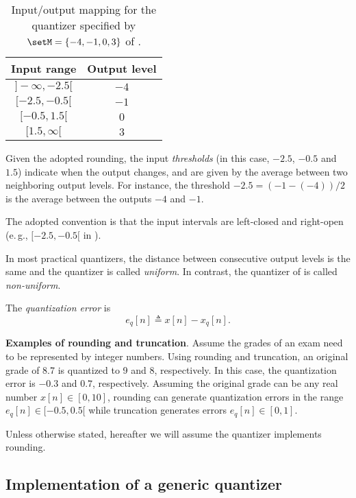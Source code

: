 \begin{table}
\centering
\caption{Input/output mapping for the quantizer specified by $\setM = \{-4,-1,0,3 \}$ of .\label{tab:nonuniform_quantizer}}
\begin{tabular}{|c|c|}
\hline
Input range  & Output level \\ \hline
$]- \infty, -2.5[$ & $-4$ \\ \hline
$[-2.5, -0.5[$ & $-1$ \\ \hline
$[-0.5, 1.5[$ & $0$ \\ \hline
$[1.5, \infty[$ & $3$ \\ \hline
\end{tabular}
\end{table}

Given the adopted rounding, the input \emph{thresholds} (in this case, $-2.5$, $-0.5$ and $1.5$) indicate when the output changes, and are given by the average between two neighboring output levels. For instance, the threshold $-2.5 = (-1 - (-4))/2$ is the average between the outputs $-4$ and $-1$.
\eExample 

The adopted convention is that the input intervals are left-closed and right-open (e.\,g., $[-2.5, -0.5[$ in ).

In most practical quantizers, the distance between consecutive output levels is the same and the quantizer is called \emph{uniform}. In contrast, the quantizer of  is called \emph{non-uniform}.

The \emph{quantization error} is
\[e_q[n] \triangleq  x[n]-x_q[n].\]

\bExample \textbf{Examples of rounding and truncation}.
Assume the grades of an exam need to be represented by integer numbers. Using rounding and truncation, an original grade of 8.7 is quantized to 9 and 8, respectively. In this case, the quantization error is $-0.3$ and $0.7$, respectively. Assuming the original grade can be any real number $x[n] \in [0, 10]$, 
rounding can generate quantization errors in the range $e_q[n] \in [-0.5, 0.5[$ while truncation generates errors $e_q[n] \in [0, 1]$.
\eExample

Unless otherwise stated, hereafter we will assume the quantizer implements rounding.


\subsection{Implementation of a generic quantizer}

